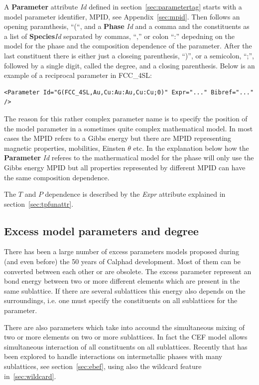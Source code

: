 \documentclass{article}
\begin{document}
\begin{appendices}
A {\bf Parameter} attribute {\em Id}  defined in
section~\ref{sec:parametertag} starts with a model parameter
identifier, MPID, see Appendix~\ref{sec:mpid}.  Then follows an
opening paramthesis, ``(``, and a {\bf Phase} {\em Id} and a comma and
the constituents as a list of {\bf Species}{\em Id} separated by
commas, ``,'' or colon ``:'' depedning on the model for the phase and
the composition dependence of the parameter.  After the last
constituent there is either just a closeing parenthesis, ``)'', or a
semicolon, ``;'', followed by a single digit, called the degree, and a
closing parenthesis.  Below is an example of a reciprocal parameter in
FCC\_4SL:

{\large
\begin{verbatim}
<Parameter Id="G(FCC_4SL,Au,Cu:Au:Au,Cu:Cu;0)" Expr="..." Bibref="..." />
\end{verbatim}
}

The reason for this rather complex parameter name is to specify the
position of the model parameter in a sometimes quite complex
mathematical model.  In most cases the MPID refers to a Gibbs energy
but there are MPID representing magnetic properties, mobilities,
Einsten $\theta$ etc.  In the explanation below how the {\bf
  Parameter} {\em Id} referes to the mathermatical model for the phase
will only use the Gibbs energy MPID but all properties represented by
different MPID can have the same composition dependence.

The $T$ and $P$ dependence is described by the {\em Expr} attribute
explained in section~\ref{sec:tpfunattr}.


\subsection{Excess model parameters and degree}\label{sec:degree}\label{sec:rkorder}

There has been a large number of excess parameters models proposed
during (and even before) the 50 years of Calphad development.  Most of
them can be converted between each other or are obsolete.  The excess
parameter represent an bond energy between two or more different
elements which are present in the same sublattice.  If there are
several sublattices this energy also depends on the surroundings,
i.e. one must specify the constituents on all sublattices for the
parameter.

There are also parameters which take into accound the simultaneous
mixing of two or more elements on two or more sublattices.  In fact
the CEF model allows simultaneous interaction of all constituents on
all sublattices.  Recently that has been explored to handle
interactions on intermetallic phases with many sublattices, see
section~\ref{sec:ebef}, using also the wildcard feature
in~\ref{sec:wildcard}.


\end{appendices}
\end{document}
